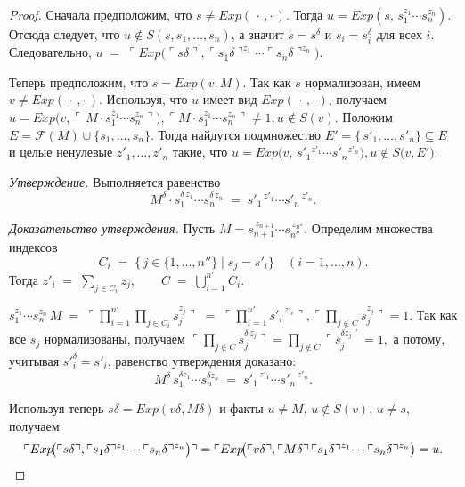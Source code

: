 \begin{proof}
Сначала предположим, что $s\neq Exp(\,\cdot\,,\cdot\,)$.  
Тогда $u=Exp(s,\,s_{1}^{z_{1}}\!\cdots s_{n}^{z_{n}})$.  
Отсюда следует, что $u\notin S(s,s_{1},\dots,s_{n})$,  
а значит $s=s^{\delta}$ и $s_{i}=s_{i}^{\delta}$ для всех $i$.  
Следовательно,
\(
  u \;=\; \ulcorner Exp\!\bigl(\ulcorner s\delta\urcorner,
                      \ulcorner s_{1}\delta\urcorner^{z_{1}}\!\cdots \ulcorner s_{n}\delta\urcorner^{z_{n}}\bigr).
\)

Теперь предположим, что $s=Exp(v,M)$.  
Так как $s$ нормализован, имеем $v\neq Exp(\,\cdot\,,\cdot\,)$.  
Используя, что $u$ имеет вид $Exp(\,\cdot\,,\cdot\,)$, получаем
\(
  u=Exp\!\bigl(v,\ulcorner\,M\!\cdot s_{1}^{z_{1}}\!\cdots s_{n}^{z_{n}}\urcorner\bigr),
  \ulcorner M\!\cdot s_{1}^{z_{1}}\!\cdots s_{n}^{z_{n}}\urcorner\neq1,
  u\notin S(v).
\)
Положим $E=\mathcal F(M)\cup\{s_{1},\dots,s_{n}\}$.
Тогда найдутся подмножество
$E'=\{\,s'_{1},\dots,s'_{n}\}\subseteq E$
и целые ненулевые $z'_{1},\dots,z'_{n}$ такие, что
\(
  u=Exp\!\bigl(v,\,s'_{1}{}^{z'_{1}}\!\cdots s'_{n}{}^{z'_{n}}\bigr),
  u\notin S\bigl(v,E'\bigr).
\)

\medskip\noindent
\textit{Утверждение.}\;
Выполняется равенство
\[
  M^{\delta}\!\cdot s_{1}^{\delta\,z_{1}}\!\cdots s_{n}^{\delta\,z_{n}}
  \;=\;
  s'_{1}{}^{\,z'_{1}}\!\cdots s'_{n}{}^{\,z'_{n}}.
\]

\medskip\noindent
\textit{Доказательство утверждения.}
Пусть 
\(
  M = s_{n+1}^{\,z_{n+1}}\!\cdots s_{n''}^{\,z_{n''}}
\).
Определим множества индексов
\[
  C_{i} \;=\; \bigl\{\,j\in\{1,\dots,n''\}\mid s_{j}=s'_{i}\bigr\}
  \quad (i=1,\dots,n).
\]
Тогда
\(
  z'_{i} \;=\; \sum_{j\in C_{i}} z_{j},
  \qquad
  C \;=\; \bigcup_{i=1}^{n'} C_{i}.
\)

\(
  s_{1}^{z_{1}}\!\cdots s_{n}^{z_{n}}\,
  M
  \;=\;
  \ulcorner\prod_{i=1}^{n'}\prod_{j\in C_{i}} s_{j}^{z_{j}}\urcorner
  \;=\;
  \ulcorner\prod_{i=1}^{n'} {s'_{i}}^{\,z'_{i}}\urcorner,
  \ulcorner\prod_{j\notin C} s_{j}^{z_{j}}\urcorner = 1.
\)
Так как все $s_{j}$ нормализованы, получаем
\(
  \ulcorner\displaystyle \prod_{j\notin C} s_{j}^{\delta\,z_{j}}\urcorner
  =\prod_{j\notin C} \ulcorner s_{j}^{\delta z_{j}\urcorner}
  =1,
\)
а потому, учитывая ${s'}_{i}^{\delta}={s'}_{i}$, равенство утверждения
доказано:
\[
  M^{\delta}\,
  s_{1}^{\delta z_{1}}\!\cdots s_{n}^{\delta z_{n}}
  \;=\;
  {s'_{1}}^{\,z'_{1}}\!\cdots{s'_{n}}^{\,z'_{n}} .
\]

Используя теперь $s\delta=Exp(v\delta,M\delta)$ и факты
$u\neq M$, $u\notin S(v)$, $u\neq s$, получаем
\[
  \ulcorner Exp\!\bigl(
      \ulcorner s\delta\urcorner,
      \ulcorner s_{1}\delta\urcorner^{z_{1}}\!\cdots \ulcorner s_{n}\delta\urcorner^{z_{n}}
  \bigr)\urcorner
  =\ulcorner Exp\!\bigl(
      \ulcorner v\delta\urcorner,
      \ulcorner M\delta\urcorner\,
      \ulcorner s_{1}\delta\urcorner^{z_{1}}\!\cdots \ulcorner s_{n}\delta\urcorner^{z_{n}}
  \bigr)
  =u.\qedhere
\]
\end{proof}

